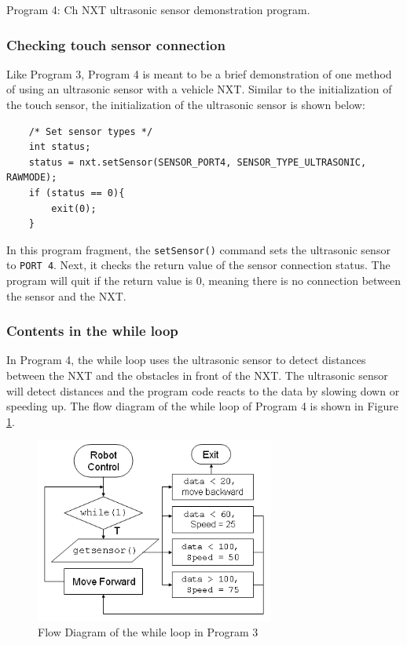 
\begin{center}
Program 4: Ch NXT ultrasonic sensor demonstration program.
\end{center}

\subsubsection*{Checking touch sensor connection}
Like Program 3, Program 4 is meant to be a brief demonstration of one method of using an ultrasonic sensor 
with a vehicle NXT.
Similar to the initialization of the touch sensor, the initialization of the ultrasonic sensor is shown below:

\begin{verbatim}
    /* Set sensor types */
    int status;
    status = nxt.setSensor(SENSOR_PORT4, SENSOR_TYPE_ULTRASONIC, RAWMODE);
    if (status == 0){
        exit(0);
    }
\end{verbatim}
In this program fragment, the \verb+setSensor()+ command sets the ultrasonic sensor to \verb+PORT 4+.
Next, it checks the return value of the sensor connection status.
The program will quit if the return value is 0, meaning there is no connection between the sensor and the NXT.

\subsubsection*{Contents in the while loop}
In Program 4, the while loop uses the ultrasonic sensor to detect distances between the NXT and the obstacles in 
front of the NXT. The ultrasonic sensor will detect distances and the program code reacts to the data by slowing 
down or speeding up. The flow diagram of the while loop of Program 4 is shown in Figure \ref{fig_NXT_ultraflow}.
\begin{figure}[h]
  \begin{center}
    \includegraphics[height=2.4in]{figure/mindstorm/NXT_ultraflow.png}
    \caption{Flow Diagram of the while loop in Program 3 \label{fig_NXT_ultraflow}}
  \end{center}
\end{figure}


